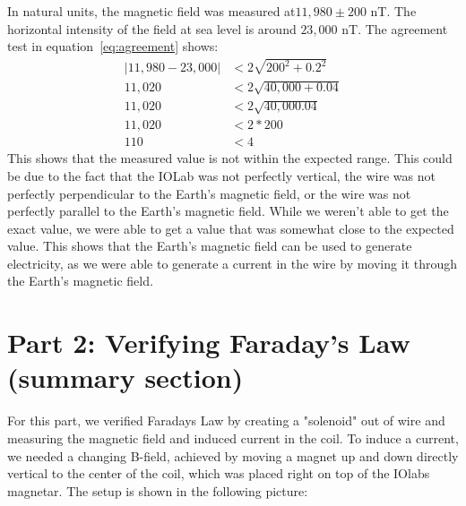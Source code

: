 \documentclass[11pt]{article}
\let\oldsection\section
\renewcommand\section{\clearpage\oldsection}
\begin{document}
    In natural units, the magnetic field was measured at$11,980 \pm 200$ nT.
    The horizontal intensity of the field at sea level is around $23,000$ nT.
    The agreement test in equation~\ref{eq:agreement} shows:
    \begin{align*}
        |11,980 - 23,000| &< 2 \sqrt{200^2 + 0.2^2} \\
        11,020 &< 2 \sqrt{40,000 + 0.04} \\
        11,020 &< 2 \sqrt{40,000.04} \\
        11,020 &< 2 * 200 \\
        110 &< 4
    \end{align*}
    This shows that the measured value is not within the expected range.
    This could be due to the fact that the IOLab was not perfectly vertical, the wire was not perfectly perpendicular to the Earth's magnetic field, or the wire was not perfectly parallel to the Earth's magnetic field.
    While we weren't able to get the exact value, we were able to get a value that was somewhat close to the expected value.
    This shows that the Earth's magnetic field can be used to generate electricity, as we were able to generate a current in the wire by moving it through the Earth's magnetic field.



    \section{Part 2: Verifying Faraday’s Law (summary section)}\label{sec:part_2}

    For this part, we verified Faradays Law by creating a "solenoid" out of wire and measuring the magnetic field and induced current in the coil. To induce a current, we needed a changing B-field, achieved by moving a magnet up and down directly vertical to the center of the coil, which was placed right on top of the IOlabs magnetar. The setup is shown in the following picture:
\end{document}
